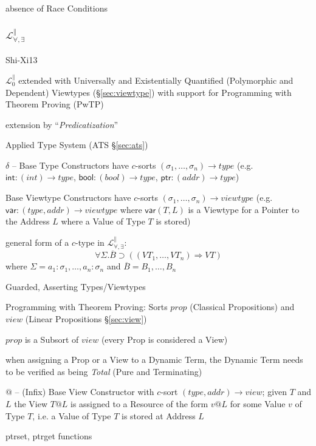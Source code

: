 absence of Race Conditions



\subsubsection{$\mathcal{L}^\parallel_{\forall,\exists}$}
\label{sec:l_par_quant}

Shi-Xi13

$\mathcal{L}^\parallel_0$ extended with Universally and Existentially
Quantified (Polymorphic and Dependent) Viewtypes
(\S\ref{sec:viewtype}) with support for Programming with Theorem
Proving (PwTP)

extension by ``\emph{Predicatization}''

Applied Type System (ATS \S\ref{sec:ats})

$\delta$ -- Base Type Constructors have $c$-sorts $(\sigma_1, \ldots,
\sigma_n) \rightarrow type$ (e.g. $\mathsf{int} : (int) \rightarrow
type$, $\mathsf{bool} : (bool) \rightarrow type$, $\mathsf{ptr} :
(addr) \rightarrow type$)

Base Viewtype Constructors have $c$-sorts $(\sigma_1, \ldots,
\sigma_n) \rightarrow viewtype$ (e.g. $\mathsf{var} : (type, addr)
\rightarrow viewtype$ where $\mathsf{var}(T,L)$ is a Viewtype for a
Pointer to the Address $L$ where a Value of Type $T$ is stored)

general form of a $c$-type in $\mathcal{L}^\parallel_{\forall,
  \exists}$:
\[
  \forall\Sigma.\overline{B}
    \supset ((VT_1, \ldots, VT_n) \Rightarrow VT)
\]
where $\Sigma = a_1 : \sigma_1, \ldots, a_n : \sigma_n$ and
$\overline{B} = B_1, \ldots, B_n$

Guarded, Asserting Types/Viewtypes %

Programming with Theorem Proving: Sorts $prop$ (Classical
Propositions) and $view$ (Linear Propositions \S\ref{sec:view})

$prop$ is a Subsort of $view$ (every Prop is considered a View)

when assigning a Prop or a View to a Dynamic Term, the Dynamic Term
needs to be verified as being \emph{Total} (Pure and Terminating)

$@$ -- (Infix) Base View Constructor with $c$-sort $(type, addr)
\rightarrow view$; given $T$ and $L$ the View $T@L$ is assigned to a
Resource of the form $v@L$ for some Value $v$ of Type $T$, i.e. a
Value of Type $T$ is stored at Address $L$

ptrset, ptrget functions %


